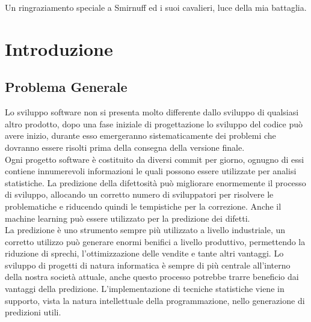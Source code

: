 \documentclass[%
    corpo=12pt,
    twoside,
    oldstyle,
    autoretitolo,
    greek,
    evenboxes,
]{toptesi}
\begin{document}
\acknowledgements
Un ringraziamento speciale a Smirnuff ed i suoi cavalieri, luce della mia battaglia.

\renewcommand{\baselinestretch}{1.1}\normalsize
\indici
\renewcommand{\baselinestretch}{1.5}\normalsize

\mainmatter


\chapter{Introduzione}
\label{chap:intro}
\section{Problema Generale}
Lo sviluppo software non si presenta molto differente dallo sviluppo di qualsiasi altro prodotto, dopo una fase iniziale di progettazione lo sviluppo del codice può avere inizio, durante esso emergeranno sistematicamente dei problemi che dovranno essere risolti prima della consegna della versione finale.\\
Ogni progetto software è costituito da diversi commit per giorno, ognugno di essi contiene innumerevoli informazioni le quali possono essere utilizzate per analisi statistiche. La predizione della difettosità può migliorare enormemente il processo di sviluppo, allocando un corretto numero di sviluppatori per risolvere le problematiche e riducendo quindi le tempistiche per la correzione. Anche il machine learning può essere utilizzato per la predizione dei difetti.\\
La predizione è uno strumento sempre più utilizzato a livello industriale, un corretto utilizzo può generare enormi benifici a livello produttivo, permettendo la riduzione di sprechi, l'ottimizzazione delle vendite e tante altri vantaggi. Lo sviluppo di progetti di natura informatica è sempre di più centrale all'interno della nostra società attuale, anche questo processo potrebbe trarre beneficio dai vantaggi della predizione. L'implementazione di tecniche statistiche viene in supporto, vista la natura intellettuale della programmazione, nello generazione di predizioni utili.
\end{document}
